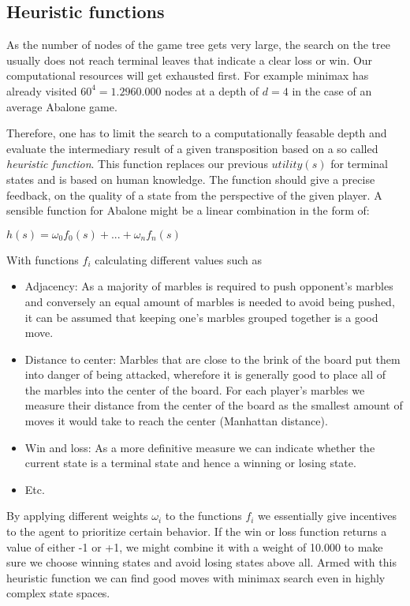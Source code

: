 \subsection{Heuristic functions}
As the number of nodes of the game tree gets very large, the search on the tree usually does not reach terminal leaves that indicate a clear loss or win. Our computational resources will get exhausted first. For example minimax has already visited $ 60 ^ 4 = 1.2960.000 $ nodes at a depth of $ d = 4 $ in the case of an average Abalone game.

Therefore, one has to limit the search to a computationally feasable depth and evaluate the intermediary result of a given transposition based on a so called \textit{heuristic function}. This function replaces our previous $ utility(s) $ for terminal states and is based on human knowledge. The function should give a precise feedback, on the quality of a state from the perspective of the given player. A sensible function for Abalone might be a linear combination in the form of:

$ h(s) = \omega_0f_0(s) + ... + \omega_nf_n(s) $

With functions $ f_i $ calculating different values such as

\begin{itemize}
    \item Adjacency: As a majority of marbles is required to push opponent's marbles and conversely an equal amount of marbles is needed to avoid being pushed, it can be assumed that keeping one's marbles grouped together is a good move.
    \item Distance to center: Marbles that are close to the brink of the board put them into danger of being attacked, wherefore it is generally good to place all of the marbles into the center of the board. For each player's marbles we measure their distance from the center of the board as the smallest amount of moves it would take to reach the center (Manhattan distance).
    \item Win and loss: As a more definitive measure we can indicate whether the current state is a terminal state and hence a winning or losing state.
    \item Etc.
\end{itemize}

By applying different weights $ \omega_i $ to the functions $ f_i $ we essentially give incentives to the agent to prioritize certain behavior. If the win or loss function returns a value of either -1 or +1, we might combine it with a weight of 10.000 to make sure we choose winning states and avoid losing states above all. Armed with this heuristic function we can find good moves with minimax search even in highly complex state spaces.

